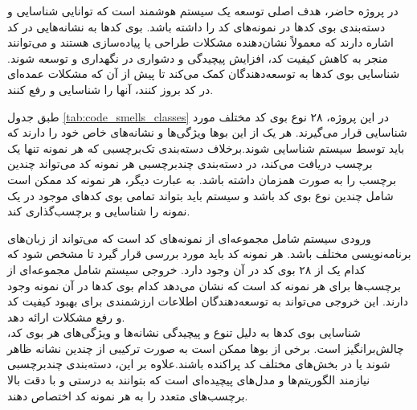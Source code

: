 در پروژه حاضر، هدف اصلی توسعه یک سیستم هوشمند است که توانایی شناسایی و دسته‌بندی بوی کدها در نمونه‌های کد را داشته باشد. بوی کدها به نشانه‌هایی در کد اشاره دارند که معمولاً نشان‌دهنده مشکلات طراحی یا پیاده‌سازی هستند و می‌توانند منجر به کاهش کیفیت کد، افزایش پیچیدگی و دشواری در نگهداری و توسعه شوند. شناسایی بوی کدها به توسعه‌دهندگان کمک می‌کند تا پیش از آن که مشکلات عمده‌ای در کد بروز کنند، آنها را شناسایی و رفع کنند.

طبق جدول \ref{tab:code_smells_classes}
در این پروژه، ۲۸ نوع بوی کد مختلف مورد شناسایی قرار می‌گیرند. هر یک از این بوها ویژگی‌ها و نشانه‌های خاص خود را دارند که باید توسط سیستم شناسایی شوند.برخلاف دسته‌بندی تک‌برچسبی که هر نمونه تنها یک برچسب دریافت می‌کند، در دسته‌بندی چندبرچسبی هر نمونه کد می‌تواند چندین برچسب را به صورت همزمان داشته باشد. به عبارت دیگر، هر نمونه کد ممکن است شامل چندین نوع بوی کد باشد و سیستم باید بتواند تمامی بوی کدهای موجود در یک نمونه را شناسایی و برچسب‌گذاری کند.
\clearpage


ورودی سیستم شامل مجموعه‌ای از نمونه‌های کد است که می‌تواند از زبان‌های برنامه‌نویسی مختلف باشد. هر نمونه کد باید مورد بررسی قرار گیرد تا مشخص شود که کدام یک از ۲۸ بوی کد در آن وجود دارد.
خروجی سیستم شامل مجموعه‌ای از برچسب‌ها برای هر نمونه کد است که نشان می‌دهد کدام بوی کدها در آن نمونه وجود دارند. این خروجی می‌تواند به توسعه‌دهندگان اطلاعات ارزشمندی برای بهبود کیفیت کد و رفع مشکلات ارائه دهد.
\\
شناسایی بوی کدها به دلیل تنوع و پیچیدگی نشانه‌ها و ویژگی‌های هر بوی کد، چالش‌برانگیز است. برخی از بوها ممکن است به صورت ترکیبی از چندین نشانه ظاهر شوند یا در بخش‌های مختلف کد پراکنده باشند.علاوه بر این، دسته‌بندی چندبرچسبی نیازمند الگوریتم‌ها و مدل‌های پیچیده‌ای است که بتوانند به درستی و با دقت بالا برچسب‌های متعدد را به هر نمونه کد اختصاص دهند.
\clearpage